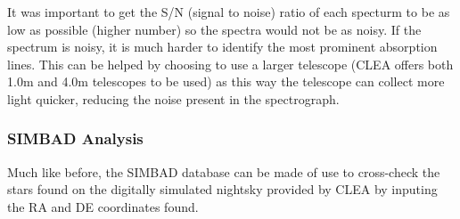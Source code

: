 \documentclass[12pt]{article}
\begin{document}
It was important to get the S/N (signal to noise) ratio of each specturm to be as low as possible (higher number) so the spectra would not be as noisy. If the spectrum
is noisy, it is much harder to identify the most prominent absorption lines. This can be helped by choosing to use a larger telescope (CLEA offers both 1.0m and 4.0m telescopes to be used) as this
way the telescope can collect more light quicker, reducing the noise present in the spectrograph. 

\subsubsection{SIMBAD Analysis}

Much like before, the SIMBAD database can be made of use to cross-check the stars found on the digitally simulated nightsky provided by CLEA by inputing
the RA and DE coordinates found.

\begin{table}[H]
    \centering
    \caption{Stars found through telescope cross-matched on SIMBAD to a radius of 5 arc min.}
    \label{tab:6}
\end{table}
\end{document}
